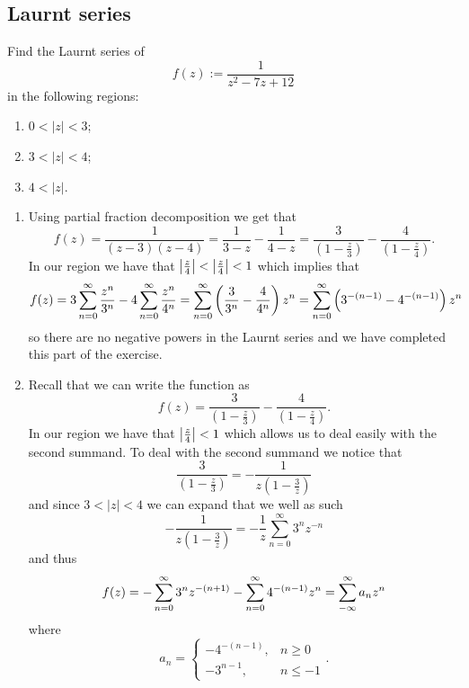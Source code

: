\documentclass[11pt,a4paper]{article}
\begin{document}
\subsection{Laurnt series}
\begin{exercise}
  Find the Laurnt series of
  \[
    f(z) := \frac{1}{z^2 - 7z + 12}
  \]
  in the following regions:
  \begin{enumerate}
    \item[(1)] $0 < |z| < 3$;
    \item[(2)] $3 < |z| < 4$;
    \item[(3)] $4 < |z|$.
  \end{enumerate}
\end{exercise}
\begin{solution} \phantom{}
\begin{enumerate}
  \item[(1)] Using partial fraction decomposition we get that
    \[
      f(z) =
      \frac{1}{(z - 3)(z - 4)} =
      \frac{1}{3 - z} - \frac{1}{4 - z} =
      \frac{3}{(1 - \frac{z}{3})} - \frac{4}{(1 - \frac{z}{4})}.
    \]
    In our region we have that $\left\lvert\frac{z}{4}\right\rvert < \left\lvert\frac{z}{4}\right\rvert < 1$
    which implies that
    \[
      f(z) =
      3 \sum_{n=0}^{\infty} \frac{z^n}{3^n} -
      4 \sum_{n=0}^{\infty} \frac{z^n}{4^n} =
      \sum_{n=0}^{\infty} \del{\frac{3}{3^n} - \frac{4}{4^n}} z^n =
      \sum_{n=0}^{\infty} \del{3^{-(n-1)} - 4^{-(n-1)}} z^n
    \]
    so there are no negative powers in the Laurnt series and we have
    completed this part of the exercise.
  \item[(2)] Recall that we can write the function as
    \[
      f(z) =
      \frac{3}{(1 - \frac{z}{3})} - \frac{4}{(1 - \frac{z}{4})}.
    \]
    In our region we have that $\left\lvert\frac{z}{4}\right\rvert < 1$
    which allows us to deal easily with the second summand.
    To deal with the second summand we notice that
    \[
      \frac{3}{\left(1 - \frac{z}{3}\right)} =
      - \frac{1}{z \left(1 - \frac{3}{z}\right)}
    \]
    and since $3 < |z| < 4$ we can expand that we well as such
    \[
      - \frac{1}{z \left(1 - \frac{3}{z}\right)} =
      - \frac{1}{z} \sum_{n=0}^{\infty} 3^n z^{-n}
    \]
    and thus
    \[
      f(z) =
      - \sum_{n=0}^{\infty} 3^{n} z^{-(n+1)}
      - \sum_{n=0}^{\infty} 4^{-(n-1)} z^{n} =
      \sum_{-\infty}^{\infty} a_n z^n
    \]
    where
    \[
      a_n =
      \begin{cases}
        -4^{-(n-1)}, &n \geq 0 \\
        -3^{n-1}, &n \le -1
      \end{cases}.
\]
\end{enumerate}
\end{solution}
\end{document}
